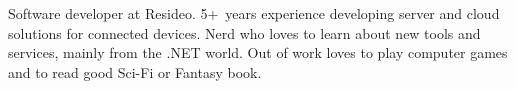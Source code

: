 

\begin{cvparagraph}

Software developer at Resideo. 5+~years experience developing server and cloud
solutions for connected devices. Nerd who loves to learn about new tools and
services, mainly from the .NET world. Out of work loves to play computer games
and to read good Sci-Fi or Fantasy book.
\end{cvparagraph}
